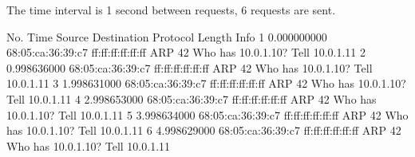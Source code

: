 The time interval is 1 second between requests, 6 requests are sent.

No.     Time           Source                Destination           Protocol Length Info
      1 0.000000000    68:05:ca:36:39:c7     ff:ff:ff:ff:ff:ff     ARP      42     Who has 10.0.1.10?  Tell 10.0.1.11
      2 0.998636000    68:05:ca:36:39:c7     ff:ff:ff:ff:ff:ff     ARP      42     Who has 10.0.1.10?  Tell 10.0.1.11
      3 1.998631000    68:05:ca:36:39:c7     ff:ff:ff:ff:ff:ff     ARP      42     Who has 10.0.1.10?  Tell 10.0.1.11
      4 2.998653000    68:05:ca:36:39:c7     ff:ff:ff:ff:ff:ff     ARP      42     Who has 10.0.1.10?  Tell 10.0.1.11
      5 3.998634000    68:05:ca:36:39:c7     ff:ff:ff:ff:ff:ff     ARP      42     Who has 10.0.1.10?  Tell 10.0.1.11
      6 4.998629000    68:05:ca:36:39:c7     ff:ff:ff:ff:ff:ff     ARP      42     Who has 10.0.1.10?  Tell 10.0.1.11



